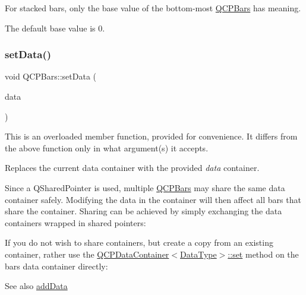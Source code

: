 For stacked bars, only the base value of the bottom-\/most \hyperlink{class_q_c_p_bars}{Q\+C\+P\+Bars} has meaning.

The default base value is 0. \mbox{\label{class_q_c_p_bars_a6dc562ec7120a8521e1061f2134367e4}} 
\subsubsection{\texorpdfstring{set\+Data()}{setData()}\hspace{0.1cm}{\footnotesize\ttfamily [1/2]}}
{\footnotesize\ttfamily void Q\+C\+P\+Bars\+::set\+Data (\begin{DoxyParamCaption}\item[{Q\+Shared\+Pointer$<$ \hyperlink{class_q_c_p_data_container}{Q\+C\+P\+Bars\+Data\+Container} $>$}]{data }\end{DoxyParamCaption})}

This is an overloaded member function, provided for convenience. It differs from the above function only in what argument(s) it accepts.

Replaces the current data container with the provided {\itshape data} container.

Since a Q\+Shared\+Pointer is used, multiple \hyperlink{class_q_c_p_bars}{Q\+C\+P\+Bars} may share the same data container safely. Modifying the data in the container will then affect all bars that share the container. Sharing can be achieved by simply exchanging the data containers wrapped in shared pointers\+: 
\begin{DoxyCodeInclude}
\end{DoxyCodeInclude}
 If you do not wish to share containers, but create a copy from an existing container, rather use the \hyperlink{class_q_c_p_data_container_ae7042bd534fc3ce7befa2ce3f790b5bf}{Q\+C\+P\+Data\+Container$<$\+Data\+Type$>$\+::set} method on the bar\textquotesingle{}s data container directly\+: 
\begin{DoxyCodeInclude}
\end{DoxyCodeInclude}
 \begin{DoxySeeAlso}{See also}
\hyperlink{class_q_c_p_bars_a323d6970d6d6e3166d89916a7f60f733}{add\+Data} 
\end{DoxySeeAlso}
\mbox{\label{class_q_c_p_bars_a2a88cd5b16ec7b71e5a590f95b50c5ce}} 
